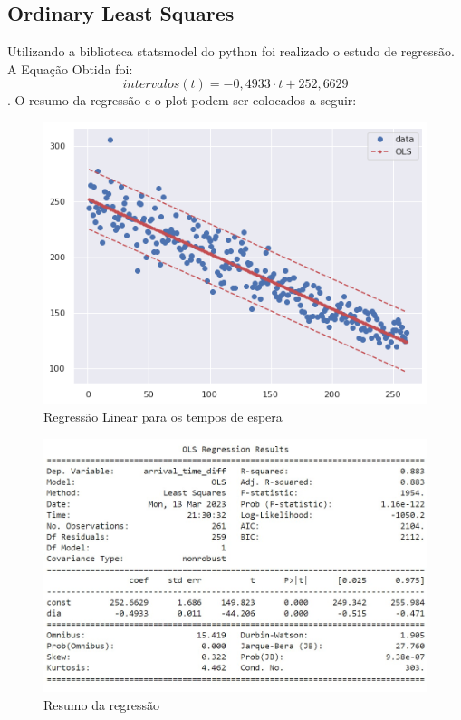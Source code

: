 \subsection{Ordinary Least Squares}

Utilizando a biblioteca statsmodel do python foi realizado o estudo de regressão. A Equação Obtida foi: $$intervalos(t) = -0,4933 \cdot t + 252,6629$$. O resumo da regressão e o plot podem ser colocados a seguir: 

\begin{figure}[H]
    \includegraphics{analise-de-dados/regressao/regressao_OLS.png}
    \caption{Regressão Linear para os tempos de espera}
    \label{fig: plot_OLS}
\end{figure}

\begin{figure}[H]
    \includegraphics[scale = 0.85]{analise-de-dados/regressao/OLS_summary.jpg}
    \caption{Resumo da regressão}
    \label{fig: sum_OLS}
\end{figure}


